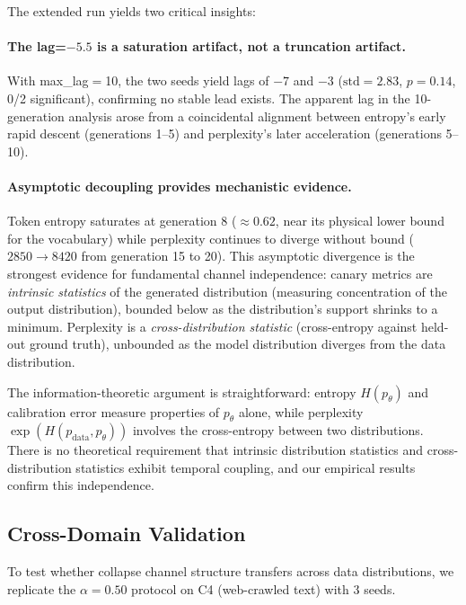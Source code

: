 \documentclass[letterpaper,11pt]{article}
\begin{document}
The extended run yields two critical insights:

\paragraph{The lag=$-5.5$ is a saturation artifact, not a truncation artifact.}
With max\_lag$=$10, the two seeds yield lags of $-7$ and $-3$ ($\text{std} = 2.83$, $p = 0.14$, 0/2 significant), confirming no stable lead exists.
The apparent lag in the 10-generation analysis arose from a coincidental alignment between entropy's early rapid descent (generations 1--5) and perplexity's later acceleration (generations 5--10).

\paragraph{Asymptotic decoupling provides mechanistic evidence.}
Token entropy saturates at generation 8 ($\approx 0.62$, near its physical lower bound for the vocabulary) while perplexity continues to diverge without bound ($2850 \to 8420$ from generation 15 to 20).
This asymptotic divergence is the strongest evidence for fundamental channel independence: canary metrics are \emph{intrinsic statistics} of the generated distribution (measuring concentration of the output distribution), bounded below as the distribution's support shrinks to a minimum.
Perplexity is a \emph{cross-distribution statistic} (cross-entropy against held-out ground truth), unbounded as the model distribution diverges from the data distribution.

The information-theoretic argument is straightforward: entropy $H(p_\theta)$ and calibration error measure properties of $p_\theta$ alone, while perplexity $\exp(H(p_{\text{data}}, p_\theta))$ involves the cross-entropy between two distributions.
There is no theoretical requirement that intrinsic distribution statistics and cross-distribution statistics exhibit temporal coupling, and our empirical results confirm this independence.

\subsection{Cross-Domain Validation}
\label{sec:c4}

To test whether collapse channel structure transfers across data distributions, we replicate the $\alpha{=}0.50$ protocol on C4 (web-crawled text) with 3 seeds.
\end{document}
